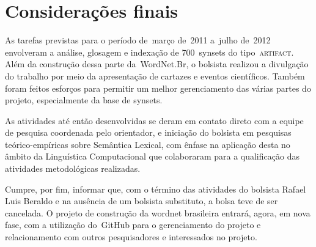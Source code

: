\chapter{Considerações finais}

% 
% 

As tarefas previstas para o período de~março de~2011 a~julho de~2012 envolveram
a análise, glosagem e indexação de 700~synsets do tipo~\textsc{artifact}. Além
da construção dessa parte da~WordNet.Br, o bolsista realizou a divulgação do
trabalho por meio da apresentação de cartazes e eventos científicos. Também
foram feitos esforços para permitir um melhor gerenciamento das várias partes
do projeto, especialmente da base de synsets.

As atividades até então desenvolvidas se deram em contato direto com a equipe
de pesquisa coordenada pelo orientador, e iniciação do bolsista em pesquisas
teórico-empíricas sobre Semântica Lexical, com ênfase na aplicação desta no
âmbito da Linguística Computacional que colaboraram para a qualificação das
atividades metodológicas realizadas.

Cumpre, por fim, informar que, com o término das atividades do bolsista Rafael
Luis Beraldo e na ausência de um bolsista substituto, a bolsa teve de ser
cancelada. O projeto de construção da wordnet brasileira entrará, agora, em
nova fase, com a utilização do~GitHub para o gerenciamento do projeto e
relacionamento com outros pesquisadores e interessados no projeto.

